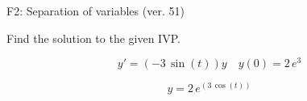 \begin{exercise}
  \begin{exerciseTitle}F2: Separation of variables (ver. 51)\end{exerciseTitle}
  \begin{exerciseStatement}
    
Find the solution to the given IVP.

    
\[y'=( -3 \, \sin\left(t\right) )y\hspace{1em} y(0)= 2 \, e^{3}\]

  \end{exerciseStatement}
  \begin{exerciseAnswer}
    
\[y= 2 \, e^{\left(3 \, \cos\left(t\right)\right)}\]

  \end{exerciseAnswer}
\end{exercise}